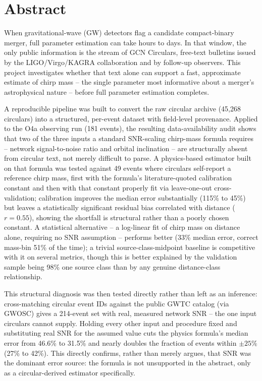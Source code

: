 \chapter*{Abstract}

When gravitational-wave (GW) detectors flag a candidate compact-binary merger, full parameter estimation can take hours to days. In that window, the only public information is the stream of GCN Circulars, free-text bulletins issued by the LIGO/Virgo/KAGRA collaboration and by follow-up observers. This project investigates whether that text alone can support a fast, approximate estimate of chirp mass -- the single parameter most informative about a merger's astrophysical nature -- before full parameter estimation completes.

A reproducible pipeline was built to convert the raw circular archive (45{,}268 circulars) into a structured, per-event dataset with field-level provenance. Applied to the O4a observing run (181 events), the resulting data-availability audit shows that two of the three inputs a standard SNR-scaling chirp-mass formula requires -- network signal-to-noise ratio and orbital inclination -- are structurally absent from circular text, not merely difficult to parse. A physics-based estimator built on that formula was tested against 49 events where circulars self-report a reference chirp mass, first with the formula's literature-quoted calibration constant and then with that constant properly fit via leave-one-out cross-validation; calibration improves the median error substantially (115\% to 45\%) but leaves a statistically significant residual bias correlated with distance ($r = 0.55$), showing the shortfall is structural rather than a poorly chosen constant. A statistical alternative -- a log-linear fit of chirp mass on distance alone, requiring no SNR assumption -- performs better (33\% median error, correct mass-bin 51\% of the time); a trivial source-class-midpoint baseline is competitive with it on several metrics, though this is better explained by the validation sample being 98\% one source class than by any genuine distance-class relationship.

This structural diagnosis was then tested directly rather than left as an inference: cross-matching circular event IDs against the public GWTC catalog (via GWOSC) gives a 214-event set with real, measured network SNR -- the one input circulars cannot supply. Holding every other input and procedure fixed and substituting real SNR for the assumed value cuts the physics formula's median error from 46.6\% to 31.5\% and nearly doubles the fraction of events within $\pm25\%$ (27\% to 42\%). This directly confirms, rather than merely argues, that SNR was the dominant error source: the formula is not unsupported in the abstract, only as a circular-derived estimator specifically.

